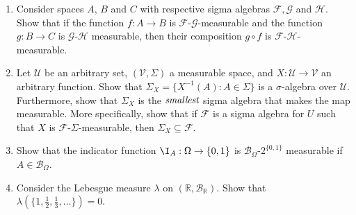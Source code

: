 \begin{enumerate}
    \item Consider spaces $A$, $B$ and $C$ with respective sigma algebras $\mathcal{F}, \mathcal{G}$ and $\mathcal{H}$. Show that if the function $f: A \rightarrow B$ is $\mathcal{F}$-$\mathcal{G}$-measurable and the function $g: B \rightarrow C$ is $\mathcal{G}$-$\mathcal{H}$ measurable, then their composition $g \circ f$ is $\mathcal{F}$-$\mathcal{H}$-measurable.
    \item Let $\mathcal{U}$ be an arbitrary set, $(\mathcal{V}, \Sigma)$ a measurable space, and $X: \mathcal{U} \rightarrow \mathcal{V}$ an arbitrary function. Show that $\Sigma_X = \{X^{-1}(A): A \in \Sigma\}$ is a $\sigma$-algebra over $\mathcal{U}$. Furthermore, show that $\Sigma_X$ is the $\emph{smallest}$ sigma algebra that makes the map measurable. More specifically, show that if $\mathcal{F}$ is a sigma algebra for $U$ such that $X$ is $\mathcal{F}$-$\Sigma$-measurable, then $\Sigma_X \subseteq \mathcal{F}$.
    \item Show that the indicator function $\I_A: \Omega \rightarrow \{0,1\}$ is $\mathcal{B}_{\Omega}$-$2^{\{0,1\}}$ measurable if $A \in \mathcal{B}_{\Omega}$.
    \item Consider the Lebesgue measure $\lambda$ on $(\mathbb{R}, \mathcal{B}_{\mathbb{R}})$. Show that $\lambda(\{1, \frac{1}{2}, \frac{1}{3}, \dots\})=0$.
\end{enumerate}
